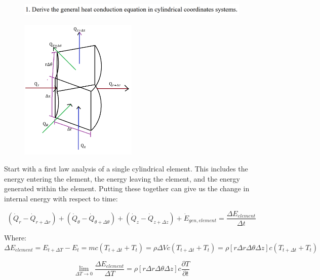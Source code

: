 \documentclass[conf]{new-aiaa}
\begin{document}
\begin{figure}[hbt!]
    \centering
    \includegraphics[width=1\textwidth]{problems/p1.png}
    \label{fig:p1}
\end{figure}
\begin{figure}[hbt!]
    \centering
    \includegraphics[width=0.5\textwidth]{problems/cyl_vol.png}
    \label{fig:p1}
\end{figure}

Start with a first law analysis of a single cylindrical element. This includes the energy entering the element, the energy leaving the element, and the energy generated within the element. 
Putting these together can give us the change in internal energy with respect to time:

\begin{equation*}
    \left(\dot{Q}_{r}-\dot{Q}_{r+\Delta r}\right)+\left(\dot{Q}_{\theta}-\dot{Q}_{\theta+\Delta \theta}\right)+\left(\dot{Q}_{z}-\dot{Q}_{z+\Delta z}\right) + \dot{E}_{gen,element} = \frac{\Delta E_{element}}{\Delta t}
\end{equation*}

\noindent Where:
\begin{equation*}
    \Delta E_{element} = E_{t+\Delta T} - E_t = m c \left(T_{t+\Delta t}+T_{t}\right) = \rho \Delta V c \left(T_{t+\Delta t}+T_{t}\right) = \rho \left[r\Delta r \Delta \theta \Delta z\right] c \left(T_{t+\Delta t}+T_{t}\right) 
\end{equation*}

\begin{equation*}
    \lim_{\Delta T \rightarrow 0} \frac{\Delta E_{element}}{\Delta T}
    = \rho \left[r\Delta r \Delta \theta \Delta z\right] c \frac{\partial T}{\partial t}
\end{equation*}
\end{document}
